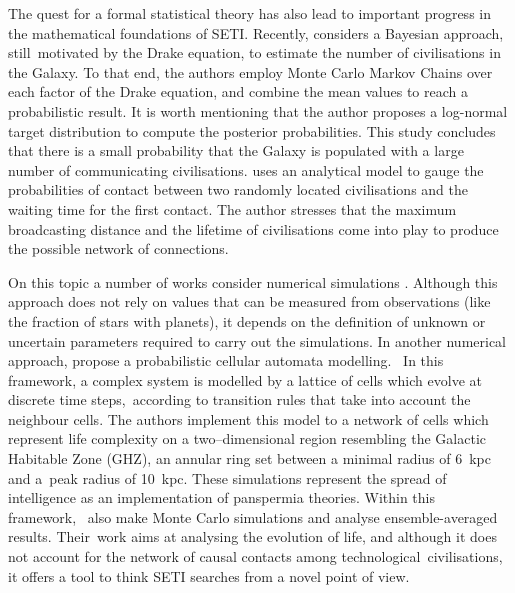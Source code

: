 \documentclass[crop]{CSLB}
\begin{document}
The quest for a formal statistical theory has also lead 
to important progress in the mathematical foundations of SETI.
%
Recently, \citet{bloetscher_using_2019} considers a Bayesian approach,
still motivated by the Drake equation, to estimate
the number of civilisations in the Galaxy.
%
To that end, the authors employ Monte Carlo Markov Chains over each factor
of the Drake equation, and combine the mean values to reach a probabilistic
result.
%
It is worth mentioning that the author proposes a log-normal target
distribution to compute the posterior probabilities.
%
This study concludes that there is a small probability that the Galaxy
is populated with a large number of communicating civilisations.
%
\citet{smith_broadcasting_2009} uses an analytical model to gauge the
probabilities of contact between two randomly located civilisations
and the waiting time for the first contact.
%
The author stresses that 
the maximum broadcasting distance and the lifetime of civilisations
come into play to produce the possible network of connections.



On this topic a number of works consider numerical simulations
\citep{forgan_evaluating_2015, vukotic_grandeur_2016,
murante_simulating_2015, forgan_numerical_2009, forgan_galactic_2017,
ramirez_new_2017}.
%
Although this approach does not rely on values that can be measured
from observations (like the fraction of stars with planets), it
depends on the definition of unknown or uncertain parameters required
to carry out the simulations.
%
In another numerical approach, \citet{vukotic_astrobiological_2012}
propose a probabilistic cellular automata modelling. 
%
In this framework, a complex system is modelled by a lattice of cells
which evolve at discrete time steps, according to transition rules
that take into account the neighbour cells.
%
The authors implement this model to a network of cells which represent
life complexity on a two--dimensional region resembling the Galactic
Habitable Zone (GHZ), an annular ring set between a minimal radius of
6~kpc and a peak radius of 10~kpc.
%
These simulations represent the spread of intelligence as an
implementation of panspermia theories.
%
Within this framework, \citet{vukotic_astrobiological_2012} also make
Monte Carlo simulations and analyse ensemble-averaged results.
%
Their work aims at analysing the evolution of life, and although it
does not account for the network of causal contacts among
technological civilisations, it offers a tool to think SETI searches
from a novel point of view.
\end{document}
